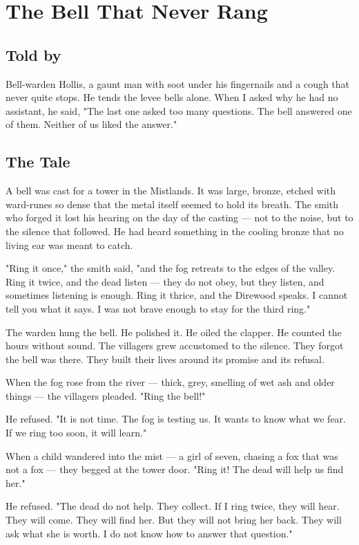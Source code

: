 \chapter{The Bell That Never Rang}

\section*{Told by}
Bell-warden Hollis, a gaunt man with soot under his fingernails and a cough that never quite stops. He tends the levee bells alone. When I asked why he had no assistant, he said, "The last one asked too many questions. The bell answered one of them. Neither of us liked the answer."

\section*{The Tale}

A bell was cast for a tower in the Mistlands. It was large, bronze, etched with ward-runes so dense that the metal itself seemed to hold its breath. The smith who forged it lost his hearing on the day of the casting — not to the noise, but to the silence that followed. He had heard something in the cooling bronze that no living ear was meant to catch.

"Ring it once," the smith said, "and the fog retreats to the edges of the valley. Ring it twice, and the dead listen — they do not obey, but they listen, and sometimes listening is enough. Ring it thrice, and the Direwood speaks. I cannot tell you what it says. I was not brave enough to stay for the third ring."

The warden hung the bell. He polished it. He oiled the clapper. He counted the hours without sound. The villagers grew accustomed to the silence. They forgot the bell was there. They built their lives around its promise and its refusal.

When the fog rose from the river — thick, grey, smelling of wet ash and older things — the villagers pleaded. "Ring the bell!"

He refused. "It is not time. The fog is testing us. It wants to know what we fear. If we ring too soon, it will learn."

When a child wandered into the mist — a girl of seven, chasing a fox that was not a fox — they begged at the tower door. "Ring it! The dead will help us find her."

He refused. "The dead do not help. They collect. If I ring twice, they will hear. They will come. They will find her. But they will not bring her back. They will ask what she is worth. I do not know how to answer that question."


